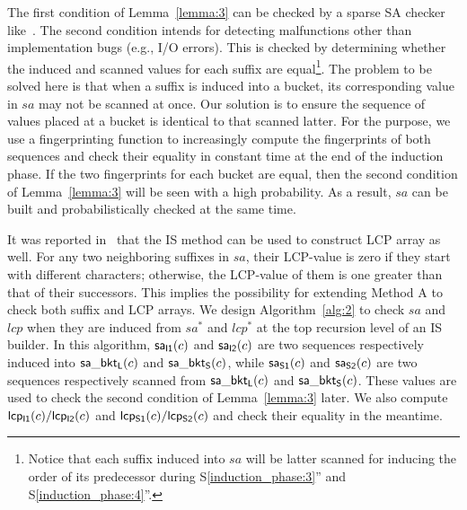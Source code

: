 \documentclass[10pt,journal,compsoc]{IEEEtran}
\begin{document}
The first condition of Lemma~\ref{lemma:3} can be checked by a sparse SA checker like~\cite{wu2017}. The second condition intends for detecting malfunctions other than implementation bugs (e.g., I/O errors). This is checked by determining whether the induced and scanned values for each suffix are equal\footnote{Notice that each suffix induced into $sa$ will be latter scanned for inducing the order of its predecessor during S\ref{induction_phase:3}'' and S\ref{induction_phase:4}''. }. The problem to be solved here is that when a suffix is induced into a bucket, its corresponding value in $sa$ may not be scanned at once. Our solution is to ensure the sequence of values placed at a bucket is identical to that scanned latter. For the purpose, we use a fingerprinting function to increasingly compute the fingerprints of both sequences and check their equality in constant time at the end of the induction phase. If the two fingerprints for each bucket are equal, then the second condition of Lemma~\ref{lemma:3} will be seen with a high probability. As a result, $sa$ can be built and probabilistically checked at the same time. 

It was reported in~\cite{Fischer11, Bingmann12} that the IS method can be used to construct LCP array as well. For any two neighboring suffixes in $sa$, their LCP-value is zero if they start with different characters; otherwise, the LCP-value of them is one greater than that of their successors. This implies the possibility for extending Method A to check both suffix and LCP arrays. We design Algorithm~\ref{alg:2} to check $sa$ and $lcp$ when they are induced from $sa^*$ and $lcp^*$ at the top recursion level of an IS builder. In this algorithm, ${\sf sa_{I1}}(c)$ and ${\sf sa_{I2}}(c)$ are two sequences respectively induced into ${\sf sa\_bkt_L}(c)$ and ${\sf sa\_bkt_S}(c)$, while ${\sf sa_{S1}}(c)$ and ${\sf sa_{S2}}(c)$ are two sequences respectively scanned from ${\sf sa\_bkt_L}(c)$ and ${\sf sa\_bkt_S}(c)$. These values are used to check the second condition of Lemma~\ref{lemma:3} later. We also compute ${\sf lcp_{I1}}(c)/{\sf lcp_{I2}}(c)$ and ${\sf lcp_{S1}}(c)/{\sf lcp_{S2}}(c)$ and check their equality in the meantime. 

\end{document}
